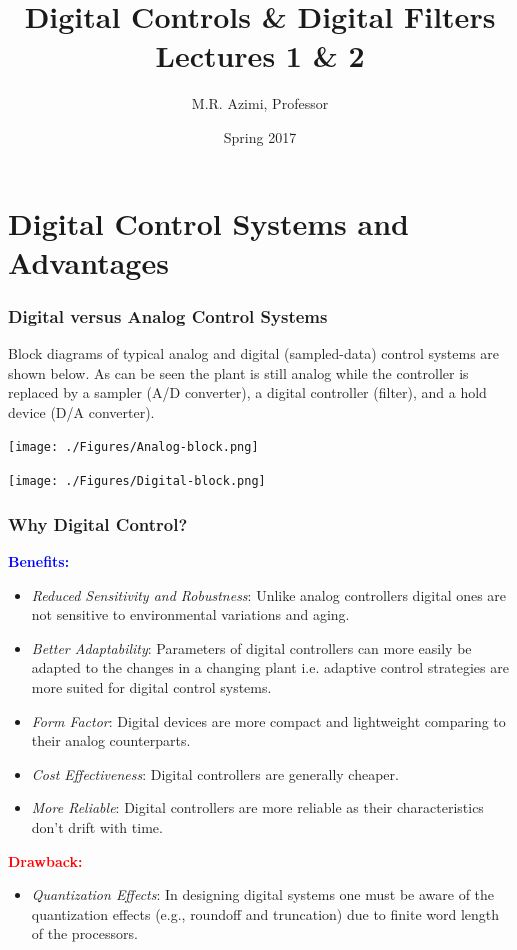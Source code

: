 \documentclass[mathserif, 10pt]{beamer} %
\title[Digital Control \& Digital Filters]{Digital Controls \& Digital Filters \\ Lectures 1 \& 2}
\author[M.R. Azimi]{M.R. Azimi, Professor}
\institute[CSU-ECE]{Department of Electrical and Computer Engineering \\ Colorado State University}
\date{Spring 2017}
\begin{document}

\frame{\titlepage}



\section{Digital Control Systems and Advantages}

\frame
{

\small
\renewcommand{\theenumi}{\alph{enumi}}
\frametitle{Digital versus Analog Control Systems}

Block diagrams of typical analog and digital (sampled-data) control systems are shown below. As can be seen the plant is still analog
while the controller is replaced by a sampler (A/D converter), a digital controller (filter), and a hold device (D/A converter).


\begin{center}
\texttt{[image: ./Figures/Analog-block.png]}
\end{center}

\begin{center}
\texttt{[image: ./Figures/Digital-block.png]}
\end{center}


}

\frame
{

\normalsize

\frametitle{Why Digital Control?}

\textcolor{blue}{\textbf{Benefits:}}\\
\begin{itemize}
\item \textit{Reduced Sensitivity and Robustness}: Unlike analog controllers digital ones are not sensitive to environmental variations and aging.
\item \textit{Better Adaptability}: Parameters of digital controllers can more easily be adapted to the changes in a changing plant i.e.
adaptive control strategies are more suited for digital control systems.
\item \textit{Form Factor}: Digital devices are more compact and lightweight comparing to their analog counterparts.
\item \textit{Cost Effectiveness}: Digital controllers are generally cheaper.
\item \textit{More Reliable}: Digital controllers are more reliable as their characteristics don't drift with time.
\end{itemize}

\textcolor{red}{\textbf{Drawback:}}\\
\begin{itemize}
\item \textit{Quantization Effects}: In designing digital systems one must be aware of the quantization effects (e.g., roundoff and truncation)
due to finite word length of the processors.
\end{itemize}
}
\end{document}
